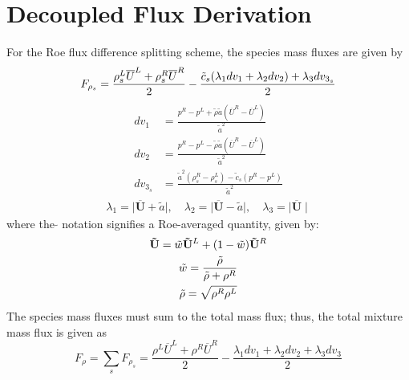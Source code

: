 \chapter{Decoupled Flux Derivation}
\label{decoupled-flux-derivation}

For the Roe flux difference splitting scheme, the species mass fluxes are given by
\begin{equation}
	F_{\rho_s} = \frac{\rho_s^L\overline{U}^L+\rho_s^R\overline{U}^R}{2}
	-\frac{\tilde{c}_s(\lambda_1 dv_1 + \lambda_2 dv_2)+\lambda_3 dv_{3_s}}{2}
  \label{species-mass} \\
\end{equation}
\begin{align}	
		dv_1 &= \frac{p^R-p^L+\tilde{\rho} \tilde{a} (\overline{U}^R-\overline{U}^L)}{\tilde{a}^2} \\
		dv_2 &= \frac{p^R-p^L-\tilde{\rho} \tilde{a} (\overline{U}^R-\overline{U}^L)}{\tilde{a}^2} \\
		dv_{3_s} &= \frac{\tilde{a}^2 (\rho_s^R-\rho_s^L)- \tilde{c}_s (p^R-p^L)}{\tilde{a}^2}
\end{align}
\begin{align}
	\lambda_1 = \mid\mathbf{\overline{U}}+\tilde{a} \mid,\quad 
	\lambda_2 = \mid \mathbf{\overline{U}}-\tilde{a} \mid,\quad 
	\lambda_3 =  \mid \mathbf{\overline{U}} \mid
\end{align}
where the $\tilde{}$ notation signifies a Roe-averaged quantity, given by:
\begin{gather}
	\mathbf{\tilde{U}} =\tilde{w} \mathbf{\tilde{U}}^L+(1-\tilde{w})\mathbf{\tilde{U}}^R \\
	\tilde{w} = \frac{\tilde{\rho}}{\tilde{\rho}+\rho^R} \\
	\tilde{\rho} = \sqrt{\rho^R\rho^L}
\end{gather}
The species mass fluxes must sum to the total mass flux; thus, the total mixture
mass flux is given as
\begin{equation}
\label{total-mass}
	F_\rho = \sum\limits_{s}{F_{\rho_s}} = \frac{\rho^L\overline{U}^L+\rho^R\overline{U}^R}{2}
	-\frac{\lambda_1 dv_1 + \lambda_2 dv_2 +\lambda_3 dv_3}{2}
\end{equation}
